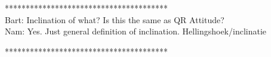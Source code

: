%
%

***************************************\\
Bart: Inclination of what? Is this the same as QR Attitude?\\
Nam: Yes. Just general definition of inclination. Hellingshoek/inclinatie

***************************************\\


